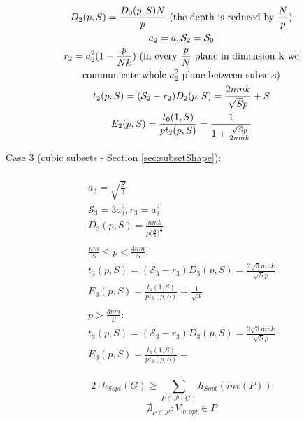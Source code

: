 \documentclass[sigconf]{acmart}
\begin{document}
\begin{multline}
\\
D_2(p,S) = \frac{D_0(p,S)N}{p} \text{ (the depth is reduced by } \frac{N}{p} 
\text{)}\\
a_2 = a , \mathcal{S}_2 = \mathcal{S}_0\\ 
r_2 = a_2^2(1 - \frac{p}{Nk}) \text{ (in every $\frac{p}{N}$ plane in dimension 
	\textbf{k} we} \\
\text{communicate whole $a_2^2$ plane between subsets)} \\
t_2(p,S) = (\mathcal{S}_2 - r_2) D_2(p,S)  = \frac{2nmk}{\sqrt{S}p} + S  \\
E_2(p,S) = \frac{t_0(1,S)}{p t_2(p,S)} = \frac{1}{1 + \frac{\sqrt{S}p}{2nmk}} \\
\end{multline}

Case 3 (cubic subsets - Section \ref{sec:subsetShape}):

\begin{multline}
\\
a_3 = \sqrt{\frac{S}{3}} \\ 
\mathcal{S}_3 = 3a_3^2, r_3 = a_3^2\\ 
D_3(p,S) = \frac{nmk}{p \Big(\frac{S}{3}\Big)^{\frac{3}{2}}}\\
\\
\frac{nm}{S} \le p < \frac{3nm}{S} :\\
t_3(p,S) = (\mathcal{S}_3 - r_3) D_3(p,S)  = \frac{2\sqrt{3}mnk}{\sqrt{S}p}  \\
E_3(p,S) = \frac{t_1(1,S)}{p t_3(p,S)} =  \frac{1}{\sqrt{3}}\\
\\
p > \frac{3nm}{S} :\\
t_3(p,S) = (\mathcal{S}_3 - r_3) D_3(p,S)  = \frac{2\sqrt{3}mnk}{\sqrt{S}p}  \\
E_3(p,S) = \frac{t_1(1,S)}{p t_3(p,S)} =  \\
\end{multline}

$$2 \cdot h_{Sopt}(G) \ge \sum_{P \in \mathcal{P}(G)} h_{Sopt}(inv(P)) $$
$$ \nexists_{P \in \mathcal{P}}: V_{w,opt} \in P $$

\end{document}
